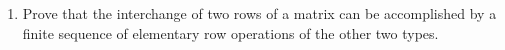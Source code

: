 \renewcommand{\theequation}{\theenumi}
\renewcommand{\thefigure}{\theenumi}
\begin{enumerate}[label=\thesubsection.\arabic*.,ref=\thesubsection.\theenumi]
%
\item Prove that the interchange of two rows of a matrix can be accomplished by a finite sequence of elementary row operations of the other two types.
\\
\solution

\end{enumerate}


